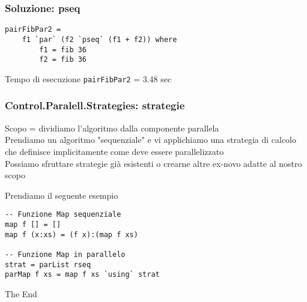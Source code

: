 \documentclass[14pt]{beamer}
\begin{document}

\begin{frame}[fragile]
\frametitle{Soluzione: pseq}
\begin{verbatim}
pairFibPar2 =
    f1 `par` (f2 `pseq` (f1 + f2)) where
        f1 = fib 36
        f2 = fib 36
\end{verbatim}
Tempo di esecuzione \texttt{pairFibPar2} = 3.48 sec\\
\end{frame}


\begin{frame}[fragile]
\frametitle{Control.Paralell.Strategies: strategie}
Scopo = dividiamo l'algoritmo dalla componente parallela\\[1ex]
Prendiamo un algoritmo "sequenziale" e vi applichiamo una strategia di calcolo che definisce implicitamente come deve essere parallelizzato \\[1ex]
Possiamo sfruttare strategie già esistenti o crearne altre ex-novo adatte al nostro scopo
\end{frame}


\begin{frame}[fragile]
Prendiamo il seguente esempio
\begin{verbatim}
-- Funzione Map sequenziale
map f [] = []
map f (x:xs) = (f x):(map f xs)

-- Funzione Map in parallelo
strat = parList rseq
parMap f xs = map f xs `using` strat
\end{verbatim}
\end{frame}

\begin{frame}
\Huge{\centerline{The End}}
\end{frame}

\end{document}
